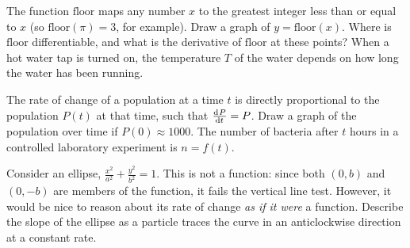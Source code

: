 \begin{questions}
  \questioM The function $ \mathrm{floor} $ maps any number $ x $ to the greatest integer less than or equal to $ x $ (so $ \mathrm{floor}(\pi) = 3 $, for
            example). Draw a graph of $ y = \mathrm{floor}(x) $. Where is $ \mathrm{floor} $ differentiable, and what is the derivative of $ \mathrm{floor} $
            at these points?
  \questioM When a hot water tap is turned on, the temperature $ T $ of the water depends on how long
            the water has been running.
  \questioM The rate of change of a population at a time $ t $ is directly proportional to the
            population $ P(t) $ at that time, such that $ \od{P}{t} = P $. Draw a graph of the
            population over time if $ P(0) \approx 1000 $.
  \questioM The number of bacteria after $ t $ hours in a controlled laboratory experiment is $ n = f(t) $.
  \questioM Consider an ellipse, $ \frac{x^2}{a^2} + \frac{y^2}{b^2} = 1 $. This is not a function: since both $ (0, b) $ and $ (0, -b) $ are
            members of the function, it fails the vertical line test. However, it would be nice to reason about its
            rate of change \textit{as if it were} a function. Describe the slope of the ellipse as a particle traces the curve in
            an anticlockwise direction at a constant rate.
\end{questions}

